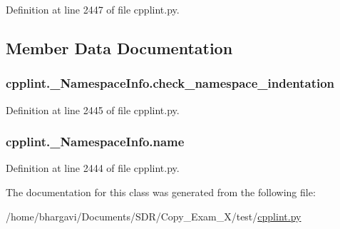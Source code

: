 Definition at line 2447 of file cpplint.\+py.



\subsection{Member Data Documentation}
\subsubsection[{\texorpdfstring{check\+\_\+namespace\+\_\+indentation}{check_namespace_indentation}}]{\setlength{\rightskip}{0pt plus 5cm}cpplint.\+\_\+\+Namespace\+Info.\+check\+\_\+namespace\+\_\+indentation}\hypertarget{classcpplint_1_1___namespace_info_ae0b0b6ffafd3336a93cddca1078df268}{}\label{classcpplint_1_1___namespace_info_ae0b0b6ffafd3336a93cddca1078df268}


Definition at line 2445 of file cpplint.\+py.

\subsubsection[{\texorpdfstring{name}{name}}]{\setlength{\rightskip}{0pt plus 5cm}cpplint.\+\_\+\+Namespace\+Info.\+name}\hypertarget{classcpplint_1_1___namespace_info_a6b518dae822e4e440405654e83dc86a1}{}\label{classcpplint_1_1___namespace_info_a6b518dae822e4e440405654e83dc86a1}


Definition at line 2444 of file cpplint.\+py.



The documentation for this class was generated from the following file\+:\begin{DoxyCompactItemize}
\item 
/home/bhargavi/\+Documents/\+S\+D\+R/\+Copy\+\_\+\+Exam\+\_\+X/test/\hyperlink{cpplint_8py}{cpplint.\+py}\end{DoxyCompactItemize}
